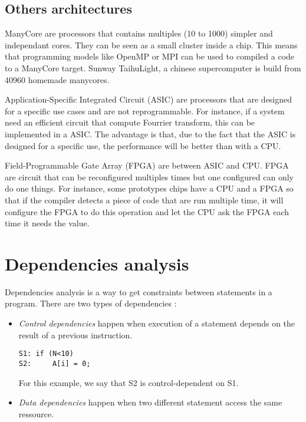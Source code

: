 \subsection{Others architectures}
ManyCore are processors that contains multiples (10 to 1000) simpler and independant cores. They can be seen as a small cluster inside a chip. This means that programming models like OpenMP or MPI can be used to compiled a code to a ManyCore target. Sunway TaihuLight, a chinese supercomputer is build from 40960 homemade manycores.

Application-Specific Integrated Circuit (ASIC) are processors that are designed for a specific use cases and are not reprogrammable. For instance, if a system need an efficient circuit that compute Fourrier transform, this can be implemented in a ASIC. The advantage is that, due to the fact that the ASIC is designed for a specific use, the performance will be better than with a CPU.

Field-Programmable Gate Array (FPGA) are between ASIC and CPU. FPGA are circuit that can be reconfigured multiples times but one configured can only do one things. For instance, some prototypes chips have a CPU and a FPGA so that if the compiler detects a piece of code that are run multiple time, it will configure the FPGA to do this operation and let the CPU ask the FPGA each time it needs the value.  

\section{Dependencies analysis}
Dependencies analysis is a way to get constraints between statements in a program. There are two types of dependencies :
\begin{itemize}
\item \emph{Control dependencies} happen when execution of a statement depends on the result of a previous instruction. 
\begin{lstlisting}
S1: if (N<10)
S2:     A[i] = 0;
\end{lstlisting}

For this example, we say that S2 is control-dependent on S1.


\item \emph{Data dependencies} happen when two different statement access the same ressource.
\end{itemize}

